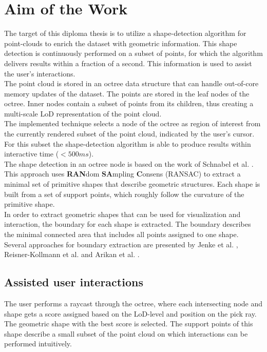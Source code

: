 \section{Aim of the Work}
\label{sec:aim}
The target of this diploma thesis is to utilize a shape-detection algorithm for point-clouds to enrich the dataset with geometric information. This shape detection is continuously performed on a subset of points, for which the algorithm delivers results within a fraction of a second. This information is used to assist the user's interactions.
\\
The point cloud is stored in an octree data structure that can handle out-of-core memory updates of the dataset. The points are stored in the leaf nodes of the octree. Inner nodes contain a subset of points from its children, thus creating a multi-scale LoD representation of the point cloud.
\\
The implemented technique selects a node of the octree as region of interest from the currently rendered subset of the point cloud, indicated by the user's cursor. For this subset the shape-detection algorithm is able to produce results within interactive time ($<500ms$).
\\
The shape detection in an octree node is based on the work of Schnabel et al. \cite{schnabel-2007-efficient}. This approach uses \textbf{RAN}dom \textbf{SA}mpling \textbf{C}onsens (RANSAC) \cite{fischler1981random} to extract a minimal set of primitive shapes that describe geometric structures. Each shape is built from a set of support points, which roughly follow the curvature of the primitive shape. 
\\
In order to extract geometric shapes that can be used for visualization and interaction, the boundary for each shape is extracted. The boundary describes the minimal connected area that includes all points assigned to one shape. Several approaches for boundary extraction are presented by Jenke et al. \cite{jenke2008surface},
Reisner-Kollmann et al. \cite{reisner2013reconstructing} and Arikan et al. \cite{arikan-2013-osn}.
\\
\subsection{Assisted user interactions}
The user performs a raycast through the octree, where each intersecting node and shape gets a score assigned based on the LoD-level and position on the pick ray. The geometric shape with the best score is selected. The support points of this shape describe a small subset of the point cloud on which interactions can be performed intuitively. 
\\

